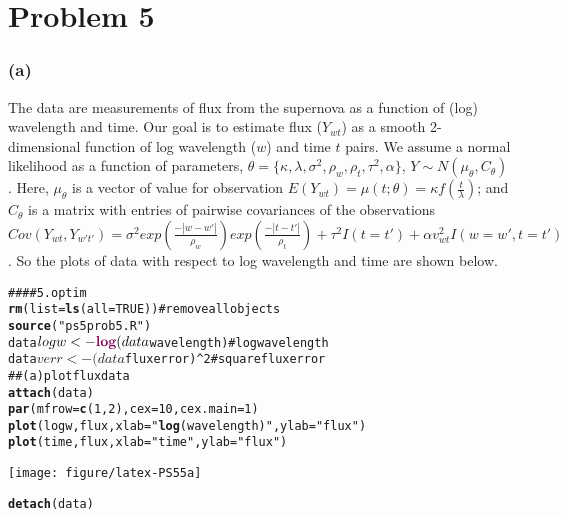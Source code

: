\documentclass{article}\usepackage{graphicx, color}
\makeatletter
\def\maxwidth{ %
  \ifdim\Gin@nat@width>\linewidth
    \linewidth
  \else
    \Gin@nat@width
  \fi
}
\newcommand{\hlfunctioncall}[1]{\textcolor[rgb]{0.501960784313725,0,0.329411764705882}{\textbf{#1}}}%
\newcommand{\hlstring}[1]{\textcolor[rgb]{0.6,0.6,1}{#1}}%
\newcommand{\hlcomment}[1]{\textcolor[rgb]{0.180392156862745,0.6,0.341176470588235}{#1}}%
\newenvironment{kframe}{%
 \def\at@end@of@kframe{}%
 \ifinner\ifhmode%
  \def\at@end@of@kframe{\end{minipage}}%
  \begin{minipage}{\columnwidth}%
 \fi\fi%
 \def\FrameCommand##1{\hskip\@totalleftmargin \hskip-\fboxsep
 \colorbox{shadecolor}{##1}\hskip-\fboxsep
     \hskip-\linewidth \hskip-\@totalleftmargin \hskip\columnwidth}%
 \MakeFramed {\advance\hsize-\width
   \@totalleftmargin\z@ \linewidth\hsize
   \@setminipage}}%
 {\par\unskip\endMakeFramed%
 \at@end@of@kframe}
\newenvironment{knitrout}{}{} %
\makeatother
\begin{document}
\newpage
\section*{Problem 5}
\subsubsection*{(a)}
\hspace{12 pt} The data are measurements of flux from the supernova as a function of (log) wavelength
and time. Our goal is to estimate flux ($Y_{wt}$) as a smooth 2-dimensional function of log wavelength ($w$)
and time $t$ pairs. We assume a normal likelihood as a function of parameters,
$\theta = \{\kappa,\lambda,\sigma^2,\rho_w,\rho_t,\tau^2,\alpha\}$, $Y\sim N(\mu_{\theta},C_{\theta})$.\newline
Here, $\mu_{\theta}$ is a vector of value for observation \newline
$\displaystyle E(Y_{wt})=\mu(t;\theta)=\kappa f(\frac{t}{\lambda})$;
and $C_{\theta}$ is a matrix with entries of pairwise covariances of the observations \newline
$\displaystyle Cov(Y_{wt},Y_{w't'}) = 
\sigma^2exp(\frac{-|w-w'|}{\rho_w})exp(\frac{-|t-t'|}{\rho_t}) + 
\tau^2I(t=t') + \alpha v^2_{wt}I(w=w',t=t')$. \newline
So the plots of data with respect to log wavelength and time are shown below.

\begin{knitrout}
\color{fgcolor}\begin{kframe}
\begin{alltt}
\hlcomment{#### 5. optim}
\hlfunctioncall{rm}(list = \hlfunctioncall{ls}(all = TRUE))  \hlcomment{# remove all objects}
\hlfunctioncall{source}(\hlstring{"ps5prob5.R"})
data$logw <- \hlfunctioncall{log}(data$wavelength)  \hlcomment{# log wavelength}
data$verr <- (data$fluxerror)^2  \hlcomment{# square fluxerror}
\hlcomment{## (a) plot flux data}
\hlfunctioncall{attach}(data)
\hlfunctioncall{par}(mfrow = \hlfunctioncall{c}(1, 2), cex = 10, cex.main = 1)
\hlfunctioncall{plot}(logw, flux, xlab = \hlstring{"\hlfunctioncall{log}(wavelength)"}, ylab = \hlstring{"flux"})
\hlfunctioncall{plot}(time, flux, xlab = \hlstring{"time"}, ylab = \hlstring{"flux"})
\end{alltt}
\end{kframe}

{\centering \texttt{[image: figure/latex-PS55a]} 

}


\begin{kframe}\begin{alltt}
\hlfunctioncall{detach}(data)
\end{alltt}
\end{kframe}
\end{knitrout}
\end{document}
